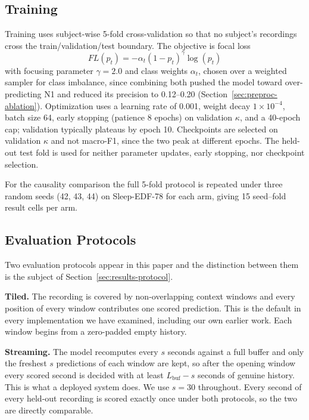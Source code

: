\documentclass[conference]{IEEEtran}
\begin{document}
\subsection{Training}

Training uses subject-wise 5-fold cross-validation so that no subject's recordings cross the
train/validation/test boundary. The objective is focal loss~\cite{focal}
\begin{equation}
FL(p_t) = -\alpha_t (1-p_t)^{\gamma}\log(p_t)
\end{equation}
with focusing parameter $\gamma = 2.0$ and class weights $\alpha_t$, chosen over a weighted sampler
for class imbalance, since combining both pushed the model toward over-predicting N1 and reduced its
precision to 0.12--0.20 (Section~\ref{sec:preproc-ablation}). Optimization uses a learning rate of
0.001, weight decay $1\times10^{-4}$, batch size 64, early stopping (patience 8 epochs) on
validation $\kappa$, and a 40-epoch cap; validation typically plateaus by epoch 10. Checkpoints are
selected on validation $\kappa$ and not macro-F1, since the two peak at different epochs. The
held-out test fold is used for neither parameter updates, early stopping, nor checkpoint selection.

For the causality comparison the full 5-fold protocol is repeated under three random seeds (42, 43,
44) on Sleep-EDF-78 for each arm, giving 15 seed--fold result cells per arm.

\subsection{Evaluation Protocols}
\label{sec:protocol}

Two evaluation protocols appear in this paper and the distinction between them is the subject of
Section~\ref{sec:results-protocol}.

\textbf{Tiled.} The recording is covered by non-overlapping context windows and every position of
every window contributes one scored prediction. This is the default in every implementation we have
examined, including our own earlier work. Each window begins from a zero-padded empty history.

\textbf{Streaming.} The model recomputes every $s$ seconds against a full buffer and only the
freshest $s$ predictions of each window are kept, so after the opening window every scored second is
decided with at least $L_{\text{buf}} - s$ seconds of genuine history. This is what a deployed system
does. We use $s = 30$ throughout. Every second of every held-out recording is scored exactly once
under both protocols, so the two are directly comparable.
\end{document}
